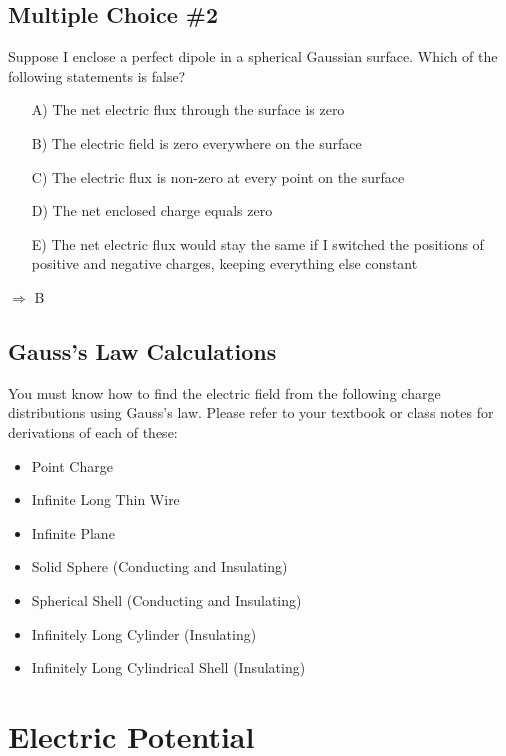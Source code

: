 \documentclass[11pt]{article}
\begin{document}
\subsection{Multiple Choice \#2}
Suppose I enclose a perfect dipole in a spherical Gaussian surface.  Which of the following statements is false?

\begin{itemize}
\item[A)] The net electric flux through the surface is zero
\item[B)] The electric field is zero everywhere on the surface
\item[C)] The electric flux is non-zero at every point on the surface
\item[D)] The net enclosed charge equals zero
\item[E)] The net electric flux would stay the same if I switched the positions of positive and negative charges, keeping everything else constant
\end{itemize}
$\Rightarrow$ B

\subsection{Gauss's Law Calculations}
You must know how to find the electric field from the following charge distributions using Gauss's law.  Please refer to your textbook or class notes for derivations of each of these:

\begin{itemize}
\item Point Charge
\item Infinite Long Thin Wire
\item Infinite Plane
\item Solid Sphere (Conducting and Insulating)
\item Spherical Shell (Conducting and Insulating)
\item Infinitely Long Cylinder (Insulating)
\item Infinitely Long Cylindrical Shell (Insulating)
\end{itemize}


\pagebreak
\section{Electric Potential}
\vspace{10pt}
\end{document}
